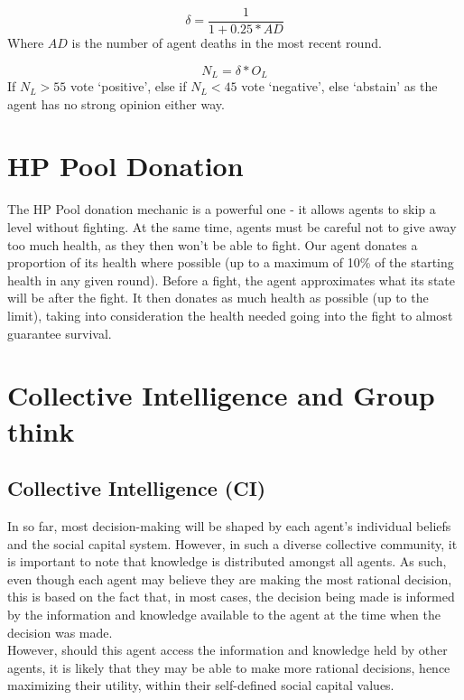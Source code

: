 \begin{equation}\label{eq:T6AgentDeathsFormula}
    \delta = \frac{1}{1+0.25*AD}
\end{equation}
Where $AD$ is the number of agent deaths in the most recent round.

\begin{equation}\label{eq:T6NoConfidenceValue}
    N_{L} = \delta * O_{L} 
\end{equation}
If $N_{L} > 55$ vote `positive', else if $N_L < 45$ vote `negative', else `abstain' as the agent has no strong opinion either way.

\section{HP Pool Donation}

The HP Pool donation mechanic is a powerful one - it allows agents to skip a level without fighting. At the same time, agents must be careful not to give away too much health, as they then won't be able to fight. Our agent donates a proportion of its health where possible (up to a maximum of 10\% of the starting health in any given round). Before a fight, the agent approximates what its state will be after the fight. It then donates as much health as possible (up to the limit), taking into consideration the health needed going into the fight to almost guarantee survival.

\section{Collective Intelligence and Group think}
\subsection{Collective Intelligence (CI)}
In so far, most decision-making will be shaped by each agent's individual beliefs and the social capital system. However, in such a diverse collective community, it is important to note that knowledge is distributed amongst all agents. As such, even though each agent may believe they are making the most rational decision, this is based on the fact that, in most cases, the decision being made is informed by the information and knowledge available to the agent at the time when the decision was made.\\

However, should this agent access the information and knowledge held by other agents, it is likely that they may be able to make more rational decisions, hence maximizing their utility, within their self-defined social capital values.\\

